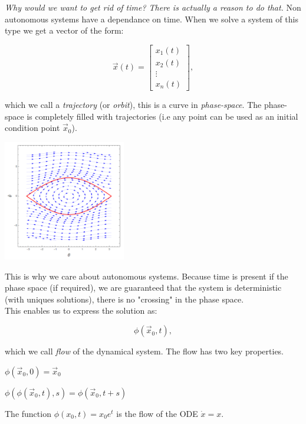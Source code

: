 \textit{Why would we want to get rid of time? There is actually a reason to do that.} Non autonomous systems have a dependance on time. When we solve a system of this type we get a vector of the form:

\[ \vec{x}(t) = \begin{bmatrix}
    x_1(t) \\
    x_2(t) \\
    \vdots \\
    x_n(t)
\end{bmatrix}, \]

which we call a \textit{trajectory} (or \textit{orbit}), this is a curve in \textit{phase-space}. The phase-space is completely filled with trajectories (i.e any point can be used as an initial condition point $\vec{x}_0$).

\begin{center}
    \includegraphics[width=0.4\textwidth]{figures/2_phase_space.png}
\end{center}

This is why we care about autonomous systems. Because time is present if the phase space (if required), we are guaranteed that the system is deterministic (with uniques solutions), there is no "crossing" in the phase space. \\

This enables us to express the solution as: 

\[ \phi(\vec{x}_0,t), \]

which we call \textit{flow} of the dynamical system. The flow has two key properties.

\begin{property}
    $\phi(\vec{x}_0,0) = \vec{x}_0$
\end{property}
\begin{property}
    $\phi(\phi(\vec{x}_0,t),s) = \phi(\vec{x}_0,t+s)$
\end{property}

\begin{example}
    The function $\phi(x_0,t) = x_0 e^t$ is the flow of the ODE $\dot{x} = x$.
\end{example}

